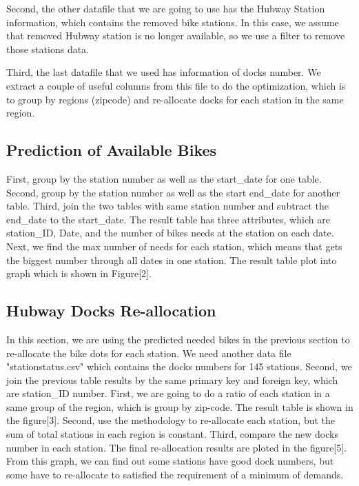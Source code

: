 \documentclass[journal, letterpaper]{IEEEtran}
\begin{document}
Second, the other datafile that we are going to use has the Hubway Station information, which contains the removed bike stations. In this case, we assume that removed Hubway station is no longer available, so we use a filter to remove those stations data. 

Third, the last datafile that we used has information of docks number. We extract a couple of useful columns from this file to do the optimization, which is to group by regions (zipcode) and re-allocate docks for each station in the same region. 

\subsection{Prediction of Available Bikes}
First, group by the station number as well as the start\_date for one table. 
Second, group by the station number as well as the start end\_date for another table.
Third, join the two tables with same station number and subtract the end\_date to the start\_date. 
The result table has three attributes, which are station\_ID, Date, and the number of bikes needs at the station on each date. Next, we find the max number of needs for each station, which means that gets the biggest number through all dates in one station. The result table plot into graph which is shown in Figure[2].

\subsection{Hubway Docks Re-allocation}
In this section, we are using the predicted needed bikes in the previous section to re-allocate the bike dots for each station. We need another data file "stationstatus.csv" which contains the docks numbers for 145 stations. Second, we join the previous table results by the same primary key and foreign key, which are station\_ID number. 
First, we are going to do a ratio of each station in a same group of the region, which is group by zip-code. The result table is shown in the figure[3]. 
Second, use the methodology to re-allocate each station, but the sum of total stations in each region is constant. 
Third, compare the new docks number in each station. The final re-allocation results are ploted in the figure[5]. 
From this graph, we can find out some stations have good dock numbers, but some have to re-allocate to satisfied the requirement of a minimum of demands. 
\end{document}
